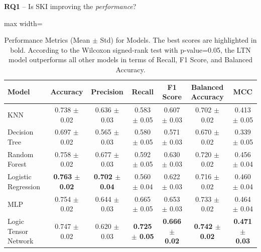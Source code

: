 \documentclass[presentation]{beamer} %
\begin{document}
{\begin{frame}
\begin{block}{\textbf{RQ1} -- Is SKI improving the \emph{performance}?}
\begin{table}[]
\centering
\begin{adjustbox}{max width=\textwidth}
\begin{tabular}{|l|c|c|c|c|c|c|}
\hline
\textbf{Model} & \textbf{Accuracy} & \textbf{Precision} & \textbf{Recall} & \textbf{F1 Score} & \textbf{Balanced Accuracy} & \textbf{MCC} \\
\hline
KNN                  & 0.738 $\pm$  0.02 & 0.636 $\pm$  0.03 & 0.583 $\pm$  0.05 & 0.607 $\pm$  0.03 & 0.702 $\pm$  0.02 & 0.413 $\pm$  0.05 \\
\hline
Decision Tree        & 0.697 $\pm$  0.02 & 0.565 $\pm$  0.03 & 0.580 $\pm$  0.05 & 0.571 $\pm$  0.03 & 0.670 $\pm$  0.02 & 0.339 $\pm$  0.05 \\
\hline
Random Forest        & 0.758 $\pm$  0.02 & 0.677 $\pm$  0.03 & 0.592 $\pm$  0.05 & 0.630 $\pm$  0.03 & 0.720 $\pm$  0.02 & 0.456 $\pm$  0.04 \\
\hline
Logistic Regression  & \textbf{0.763 $\pm$  0.02 }& \textbf{0.702 $\pm$  0.04} & 0.560 $\pm$  0.04 & 0.622 $\pm$  0.03 & 0.716 $\pm$  0.02 & 0.460 $\pm$  0.04 \\
\hline
MLP                  & 0.754 $\pm$  0.02 & 0.644 $\pm$  0.03 & 0.665 $\pm$  0.05 & 0.653 $\pm$  0.03 & 0.733 $\pm$  0.02 & 0.464 $\pm$  0.04 \\
\hline
Logic Tensor Network & 0.747 $\pm$  0.02 & 0.620 $\pm$  0.03 & \textbf{0.725 $\pm$  0.05} & \textbf{0.666 $\pm$  0.02} & \textbf{0.742 $\pm$  0.02} & \textbf{0.471 $\pm$  0.03} \\
\hline
\end{tabular}
\end{adjustbox}
\vspace{0.5em}
\caption{
  Performance Metrics (Mean $\pm$  Std) for Models.
  The best scores are highlighted in bold.
  According to the Wilcoxon signed-rank test with p-value=0.05, the LTN model outperforms all other models in terms of Recall, F1 Score, and Balanced Accuracy.
}
\label{tab:performance}
\end{table}
\end{block}


\end{frame}}
\end{document}

